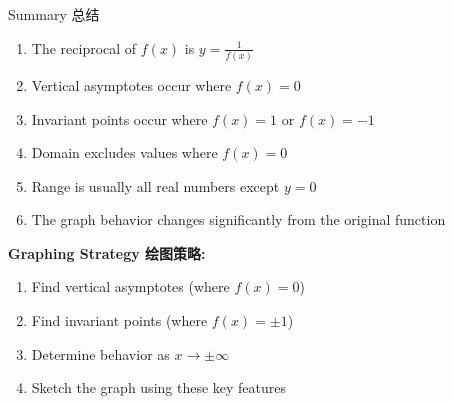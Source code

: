 \documentclass[aspectratio=169]{beamer}
\begin{document}
\begin{frame}{Summary 总结}
    \begin{tcolorbox}[colback=lightgray,colframe=primary,title=Key Points 要点]
        \footnotesize
        \begin{enumerate}
            \item The reciprocal of $f(x)$ is $y = \frac{1}{f(x)}$
            \item Vertical asymptotes occur where $f(x) = 0$
            \item Invariant points occur where $f(x) = 1$ or $f(x) = -1$
            \item Domain excludes values where $f(x) = 0$
            \item Range is usually all real numbers except $y = 0$
            \item The graph behavior changes significantly from the original function
        \end{enumerate}
    \end{tcolorbox}
    \vspace{1em}
    \textbf{Graphing Strategy 绘图策略:}
    \begin{enumerate}
        \item Find vertical asymptotes (where $f(x) = 0$)
        \item Find invariant points (where $f(x) = \pm 1$)
        \item Determine behavior as $x \to \pm\infty$
        \item Sketch the graph using these key features
    \end{enumerate}
\end{frame}
\end{document}
